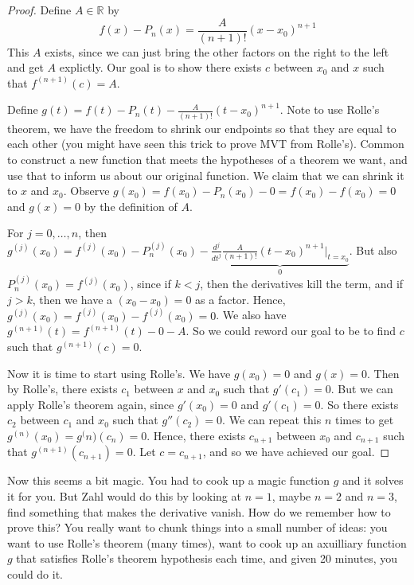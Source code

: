 \documentclass{article}
\theoremstyle{plain}
\theoremstyle{remark}
\newcommand{\R}{{\mathbb R}}
\begin{document}
\begin{proof}
	Define $A \in \R$ by
	\[
		f(x) - P_n(x) = \frac{A}{(n+1)!}(x-x_0)^{n+1}
	\]
	This $A$ exists, since we can just bring the other factors
	on the right to the left and get $A$ explictly.
	Our goal is to show there exists $c$ between $x_0$ and $x$ such that $f^{(n+1)}(c) = A$.

	Define $g(t) = f(t) - P_n(t) - \frac{A}{(n+1)!}(t-x_0)^{n+1}$.
	Note to use Rolle's theorem,
	we have the freedom to shrink our endpoints so that they are equal to each other
	(you might have seen this trick to prove MVT from Rolle's).
	Common to construct a new function that meets the hypotheses of a theorem we want,
	and use that to inform us about our original function.
	We claim that we can shrink it to $x$ and $x_0$.
	Observe $g(x_0) = f(x_0) - P_n(x_0) - 0 = f(x_0) - f(x_0) = 0$ and
	$g(x) = 0$ by the definition of $A$.

	For $j = 0, \dots, n$, then
	$g^{(j)}(x_0) = f^{(j)}(x_0) - P_n^{(j)}(x_0) -
	\underbrace{\frac{d^j}{dt^j}\frac{A}{(n+1)!}(t-x_0)^{n+1}\big\vert_{t=x_0}}_0$.
	But also $P_n^{(j)}(x_0) = f^{(j)}(x_0)$,
	since if $k < j$, then the derivatives kill the term,
	and if $j > k$, then we have a $(x_0 - x_0) = 0$ as a factor.
	Hence, $g^{(j)}(x_0) = f^{(j)}(x_0) - f^{(j)}(x_0) = 0$.
	We also have $g^{(n+1)}(t) = f^{(n+1)}(t) - 0 - A$.
	So we could reword our goal to be to find $c$ such that $g^{(n+1)}(c) = 0$.

	Now it is time to start using Rolle's.
	We have $g(x_0) = 0$ and $g(x) = 0$.
	Then by Rolle's, there exists $c_1$ between $x$ and $x_0$ such that
	$g'(c_1) = 0$.
	But we can apply Rolle's theorem again,
	since $g'(x_0) = 0$ and $g'(c_1) = 0$.
	So there exists $c_2$ between $c_1$ and $x_0$ such that $g''(c_2) = 0$.
	We can repeat this $n$ times to get $g^{(n)}(x_0) = g^({n)}(c_n) = 0$.
	Hence, there exists $c_{n+1}$ between $x_0$ and $c_{n+1}$ such that $g^{(n+1)}(c_{n+1}) = 0$.
	Let $c = c_{n+1}$, and so we have achieved our goal.
\end{proof}
Now this seems a bit magic.
You had to cook up a magic function $g$ and it solves it for you.
But Zahl would do this by looking at $n=1$, maybe $n=2$ and $n=3$,
find something that makes the derivative vanish.
How do we remember how to prove this?
You really want to chunk things into a small number of ideas:
you want to use Rolle's theorem (many times),
want to cook up an axuilliary function $g$ that satisfies Rolle's theorem hypothesis each time,
and given 20 minutes, you could do it.
\end{document}
